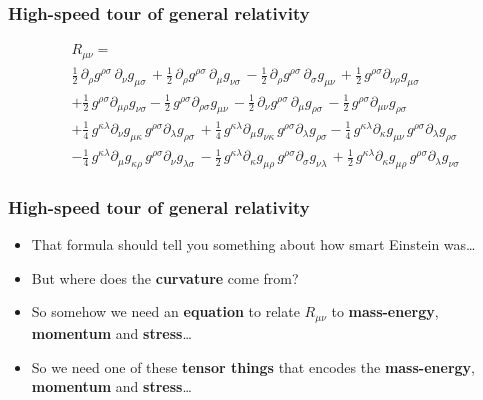 \documentclass{beamer}
\begin{document}
\begin{frame}
  \frametitle{High-speed tour of general relativity}
\begin{equation*}
\begin{aligned}
&R_{\mu \nu}=\\
&\frac{1}{2}\, {\partial}_{\rho}{{g}^{\rho \sigma}}\,  {\partial}_{\nu}{{g}_{\mu \sigma}}\,  + \frac{1}{2}\, {\partial}_{\rho}{{g}^{\rho \sigma}}\,  {\partial}_{\mu}{{g}_{\nu \sigma}}\,  - \frac{1}{2}\, {\partial}_{\rho}{{g}^{\rho \sigma}}\,  {\partial}_{\sigma}{{g}_{\mu \nu}}\,  + \frac{1}{2}\, {g}^{\rho \sigma} {\partial}_{\nu \rho}{{g}_{\mu \sigma}}\\ 
& + \frac{1}{2}\, {g}^{\rho \sigma} {\partial}_{\mu \rho}{{g}_{\nu \sigma}} - \frac{1}{2}\, {g}^{\rho \sigma} {\partial}_{\rho \sigma}{{g}_{\mu \nu}}\,  - \frac{1}{2}\, {\partial}_{\nu}{{g}^{\rho \sigma}}\,  {\partial}_{\mu}{{g}_{\rho \sigma}}\,  - \frac{1}{2}\, {g}^{\rho \sigma} {\partial}_{\mu \nu}{{g}_{\rho \sigma}}\\
&+ \frac{1}{4}\, {g}^{\kappa \lambda} {\partial}_{\nu}{{g}_{\mu \kappa}}\,  {g}^{\rho \sigma} {\partial}_{\lambda}{{g}_{\rho \sigma}}\,  + \frac{1}{4}\, {g}^{\kappa \lambda} {\partial}_{\mu}{{g}_{\nu \kappa}}\,  {g}^{\rho \sigma} {\partial}_{\lambda}{{g}_{\rho \sigma}} - \frac{1}{4}\, {g}^{\kappa \lambda} {\partial}_{\kappa}{{g}_{\mu \nu}}\,  {g}^{\rho \sigma} {\partial}_{\lambda}{{g}_{\rho \sigma}}\\
&- \frac{1}{4}\, {g}^{\kappa \lambda} {\partial}_{\mu}{{g}_{\kappa \rho}}\,  {g}^{\rho \sigma} {\partial}_{\nu}{{g}_{\lambda \sigma}}\,  - \frac{1}{2}\, {g}^{\kappa \lambda} {\partial}_{\kappa}{{g}_{\mu \rho}}\,  {g}^{\rho \sigma} {\partial}_{\sigma}{{g}_{\nu \lambda}}\,  + \frac{1}{2}\, {g}^{\kappa \lambda} {\partial}_{\kappa}{{g}_{\mu \rho}}\,  {g}^{\rho \sigma} {\partial}_{\lambda}{{g}_{\nu \sigma}} 
\end{aligned}
\end{equation*}
\end{frame}

\begin{frame}
  \frametitle{High-speed tour of general relativity}
  \begin{itemize}
    \item<1-> That formula should tell you something about how smart Einstein was\ldots
    \item<2-> But where does the \textbf{curvature} come from?
    \item<3-> So somehow we need an \textbf{equation} to relate $R_{\mu\nu}$ to \textbf{mass-energy}, \textbf{momentum} and \textbf{stress}\ldots
    \item<4-> So we need one of these \textbf{tensor things} that encodes the \textbf{mass-energy}, \textbf{momentum} and \textbf{stress}\ldots
  \end{itemize}
\end{frame}
\end{document}
